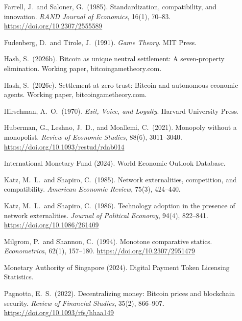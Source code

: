 \documentclass[12pt]{article}
\theoremstyle{definition}
\theoremstyle{remark}
\begin{document}
\begin{description}[style=nextline,leftmargin=0pt,labelsep=0pt,font=\normalfont]
\item Farrell, J.\ and Saloner, G.\ (1985). Standardization, compatibility,
and innovation. \emph{RAND Journal of Economics}, 16(1), 70--83.
\url{https://doi.org/10.2307/2555589}

\item Fudenberg, D.\ and Tirole, J.\ (1991). \emph{Game Theory}. MIT Press.

\item Hash, S.\ (2026b). Bitcoin as unique neutral settlement: A seven-property
elimination. Working paper, bitcoingametheory.com.

\item Hash, S.\ (2026c). Settlement at zero trust: Bitcoin and autonomous economic
agents. Working paper, bitcoingametheory.com.

\item Hirschman, A.\ O.\ (1970). \emph{Exit, Voice, and Loyalty}. Harvard
University Press.

\item Huberman, G., Leshno, J.\ D., and Moallemi, C.\ (2021). Monopoly without
a monopolist. \emph{Review of Economic Studies}, 88(6), 3011--3040.
\url{https://doi.org/10.1093/restud/rdab014}

\item International Monetary Fund (2024). World Economic Outlook Database.

\item Katz, M.\ L.\ and Shapiro, C.\ (1985). Network externalities, competition,
and compatibility. \emph{American Economic Review}, 75(3), 424--440.

\item Katz, M.\ L.\ and Shapiro, C.\ (1986). Technology adoption in the presence
of network externalities. \emph{Journal of Political Economy}, 94(4), 822--841.
\url{https://doi.org/10.1086/261409}

\item Milgrom, P.\ and Shannon, C.\ (1994). Monotone comparative statics.
\emph{Econometrica}, 62(1), 157--180.
\url{https://doi.org/10.2307/2951479}

\item Monetary Authority of Singapore (2024). Digital Payment Token Licensing
Statistics.

\item Pagnotta, E.\ S.\ (2022). Decentralizing money: Bitcoin prices and
blockchain security. \emph{Review of Financial Studies}, 35(2), 866--907.
\url{https://doi.org/10.1093/rfs/hhaa149}


\end{description}
\end{document}
